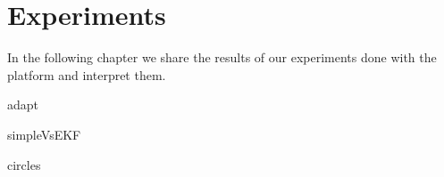 \documentclass[class=article, crop=false]{standalone}
\begin{document}
\chapter{Experiments}\label{cha:exp}

In the following chapter we share the results of our experiments done with the platform and interpret them.

{adapt}

{simpleVsEKF}

{circles}
\end{document}
